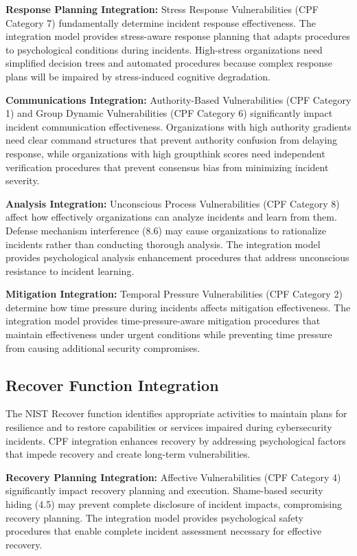 \documentclass[10pt, twocolumn]{article}
\begin{document}
\textbf{Response Planning Integration:} Stress Response Vulnerabilities (CPF Category 7) fundamentally determine incident response effectiveness. The integration model provides stress-aware response planning that adapts procedures to psychological conditions during incidents. High-stress organizations need simplified decision trees and automated procedures because complex response plans will be impaired by stress-induced cognitive degradation.

\textbf{Communications Integration:} Authority-Based Vulnerabilities (CPF Category 1) and Group Dynamic Vulnerabilities (CPF Category 6) significantly impact incident communication effectiveness. Organizations with high authority gradients need clear command structures that prevent authority confusion from delaying response, while organizations with high groupthink scores need independent verification procedures that prevent consensus bias from minimizing incident severity.

\textbf{Analysis Integration:} Unconscious Process Vulnerabilities (CPF Category 8) affect how effectively organizations can analyze incidents and learn from them. Defense mechanism interference (8.6) may cause organizations to rationalize incidents rather than conducting thorough analysis. The integration model provides psychological analysis enhancement procedures that address unconscious resistance to incident learning.

\textbf{Mitigation Integration:} Temporal Pressure Vulnerabilities (CPF Category 2) determine how time pressure during incidents affects mitigation effectiveness. The integration model provides time-pressure-aware mitigation procedures that maintain effectiveness under urgent conditions while preventing time pressure from causing additional security compromises.

\subsection{Recover Function Integration}

The NIST Recover function identifies appropriate activities to maintain plans for resilience and to restore capabilities or services impaired during cybersecurity incidents. CPF integration enhances recovery by addressing psychological factors that impede recovery and create long-term vulnerabilities.

\textbf{Recovery Planning Integration:} Affective Vulnerabilities (CPF Category 4) significantly impact recovery planning and execution. Shame-based security hiding (4.5) may prevent complete disclosure of incident impacts, compromising recovery planning. The integration model provides psychological safety procedures that enable complete incident assessment necessary for effective recovery.
\end{document}
